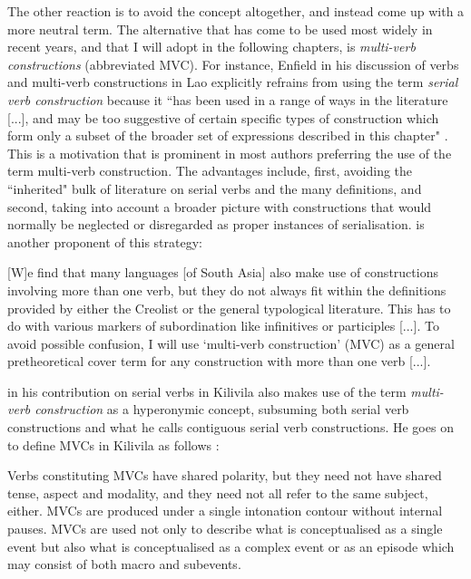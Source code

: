 The other reaction is to avoid the concept altogether, and instead come up with a more neutral term. The alternative that has come to be used most widely in recent years, and that I will adopt in the following chapters, is \textit{multi-verb constructions} (abbreviated MVC). For instance, Enfield in his discussion of verbs and multi-verb constructions in Lao explicitly refrains from using the term \textit{serial verb construction} because it ``has been used in a range of ways in the literature [...], and may be too suggestive of certain specific types of construction which form only a subset of the broader set of expressions described in this chapter" \citep[104, footnote 17]{enfield2008verbs}. This is a motivation that is prominent in most authors preferring the use of the term multi-verb construction. The advantages include, first, avoiding the ``inherited" bulk of literature on serial verbs and the many definitions, and second, taking into account a broader picture with constructions that would normally be neglected or disregarded as proper instances of serialisation. \citet[312]{nordhoff2012} is another proponent of this strategy:

\begin{modquote}{}
[W]e find that many languages [of South Asia] also make use of constructions involving more than one verb, but they do not always fit within the definitions provided by either the Creolist or the general typological literature. This has to do with various markers of subordination like infinitives or participles [...]. To avoid possible confusion, I will use `multi-verb construction' (MVC) as a general pretheoretical cover term for any construction with more than one verb [...].
\end{modquote}

\citet{senft2008event} in his contribution on serial verbs in Kilivila also makes use of the term \textit{multi-verb construction} as a hyperonymic concept, subsuming both serial verb constructions and what he calls contiguous serial verb constructions. He goes on to define MVCs in Kilivila as follows \citep[10]{senft2008event}: 

\begin{modquote}Verbs constituting MVCs have shared polarity, but they need not have shared tense, aspect and modality, and they need not all refer to the same subject, either. MVCs are produced under a single intonation contour without internal pauses. MVCs are used not only to describe what is conceptualised as a single event but also what is conceptualised as a complex event or as an episode which may consist of both macro and subevents.\end{modquote}

